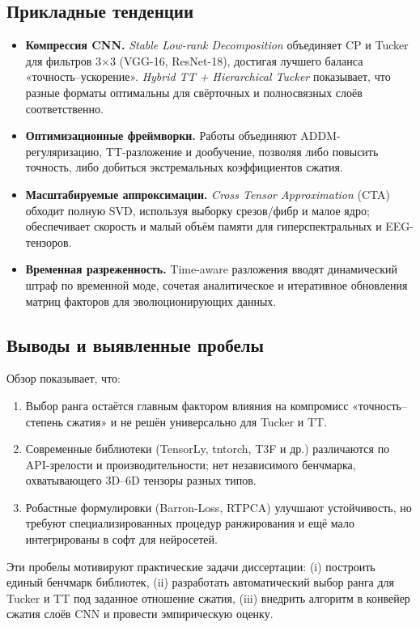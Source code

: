 \subsection*{Прикладные тенденции}

\begin{itemize}\setlength\itemsep{0.25em}
    \item \textbf{Компрессия CNN.}  
    \emph{Stable Low-rank Decomposition} \cite{stable_low_rank_tensor_decomposition} объединяет CP и Tucker для фильтров 3\(\times\)3 (VGG-16, ResNet-18), достигая лучшего баланса «точность–ускорение».  
    \emph{Hybrid TT + Hierarchical Tucker} \cite{hybrid_tensor_decomposition_c_nn} показывает, что разные форматы оптимальны для свёрточных и полносвязных слоёв соответственно.
    \item \textbf{Оптимизационные фреймворки.}  
    Работы \cite{yin2021efficienttensordecompositionbaseddnn} объединяют ADDM-регуляризацию, TT-разложение и дообучение, позволяя либо повысить точность, либо добиться экстремальных коэффициентов сжатия.
    \item \textbf{Масштабируемые аппроксимации.}  
    \emph{Cross Tensor Approximation} (CTA) \cite{cross_tensor_approximation} обходит полную SVD, используя выборку срезов/фибр и малое ядро; обеспечивает скорость и малый объём памяти для гиперспектральных и EEG-тензоров.
    \item \textbf{Временная разреженность.}  
    Time-aware разложения \cite{time_aware_tensor_decomposition} вводят динамический штраф по временной моде, сочетая аналитическое и итеративное обновления матриц факторов для эволюционирующих данных.
\end{itemize}

\subsection*{Выводы и выявленные пробелы}

Обзор показывает, что:

\begin{enumerate}\setlength\itemsep{0.25em}
    \item Выбор ранга остаётся главным фактором влияния на компромисс «точность–степень сжатия» и не решён универсально для Tucker и TT.  
    \item Современные библиотеки (TensorLy, tntorch, T3F и др.) различаются по API-зрелости и производительности; нет независимого бенчмарка, охватывающего 3D–6D тензоры разных типов.  
    \item Робастные формулировки (Barron-Loss, RTPCA) улучшают устойчивость, но требуют специализированных процедур ранжирования и ещё мало интегрированы в софт для нейросетей.
\end{enumerate}

Эти пробелы мотивируют практические задачи диссертации: (i) построить единый бенчмарк библиотек, (ii) разработать автоматический выбор ранга для Tucker и TT под заданное отношение сжатия, (iii) внедрить алгоритм в конвейер сжатия слоёв CNN и провести эмпирическую оценку.